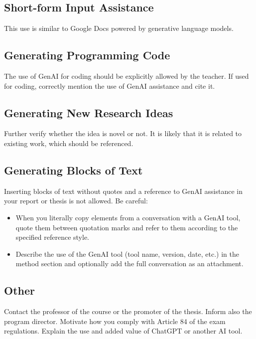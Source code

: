 \subsection*{Short-form Input Assistance}
This use is similar to Google Docs powered by generative language models.

\subsection*{Generating Programming Code}
The use of GenAI for coding should be explicitly allowed by the teacher. If used for coding, correctly mention the use of GenAI assistance and cite it.

\subsection*{Generating New Research Ideas}
Further verify whether the idea is novel or not. It is likely that it is related to existing work, which should be referenced.

\subsection*{Generating Blocks of Text}
Inserting blocks of text without quotes and a reference to GenAI assistance in your report or thesis is not allowed. Be careful:
\begin{itemize}
    \item When you literally copy elements from a conversation with a GenAI tool, quote them between quotation marks and refer to them according to the specified reference style.
    \item Describe the use of the GenAI tool (tool name, version, date, etc.) in the method section and optionally add the full conversation as an attachment.
\end{itemize}

\subsection*{Other}
Contact the professor of the course or the promoter of the thesis. Inform also the program director. Motivate how you comply with Article 84 of the exam regulations. Explain the use and added value of ChatGPT or another AI tool.

